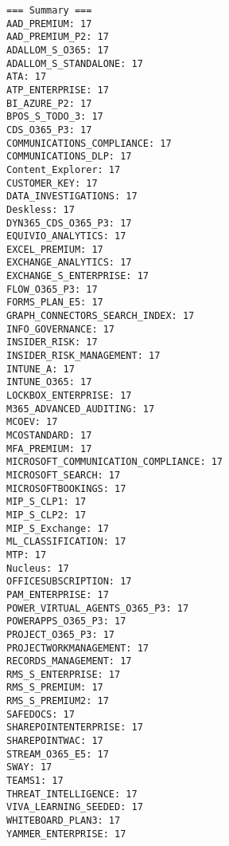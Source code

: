
\clearpage

\begin{tiny}
    \begin{verbatim}
=== Summary ===
AAD_PREMIUM: 17
AAD_PREMIUM_P2: 17
ADALLOM_S_O365: 17
ADALLOM_S_STANDALONE: 17
ATA: 17
ATP_ENTERPRISE: 17
BI_AZURE_P2: 17
BPOS_S_TODO_3: 17
CDS_O365_P3: 17
COMMUNICATIONS_COMPLIANCE: 17
COMMUNICATIONS_DLP: 17
Content_Explorer: 17
CUSTOMER_KEY: 17
DATA_INVESTIGATIONS: 17
Deskless: 17
DYN365_CDS_O365_P3: 17
EQUIVIO_ANALYTICS: 17
EXCEL_PREMIUM: 17
EXCHANGE_ANALYTICS: 17
EXCHANGE_S_ENTERPRISE: 17
FLOW_O365_P3: 17
FORMS_PLAN_E5: 17
GRAPH_CONNECTORS_SEARCH_INDEX: 17
INFO_GOVERNANCE: 17
INSIDER_RISK: 17
INSIDER_RISK_MANAGEMENT: 17
INTUNE_A: 17
INTUNE_O365: 17
LOCKBOX_ENTERPRISE: 17
M365_ADVANCED_AUDITING: 17
MCOEV: 17
MCOSTANDARD: 17
MFA_PREMIUM: 17
MICROSOFT_COMMUNICATION_COMPLIANCE: 17
MICROSOFT_SEARCH: 17
MICROSOFTBOOKINGS: 17
MIP_S_CLP1: 17
MIP_S_CLP2: 17
MIP_S_Exchange: 17
ML_CLASSIFICATION: 17
MTP: 17
Nucleus: 17
OFFICESUBSCRIPTION: 17
PAM_ENTERPRISE: 17
POWER_VIRTUAL_AGENTS_O365_P3: 17
POWERAPPS_O365_P3: 17
PROJECT_O365_P3: 17
PROJECTWORKMANAGEMENT: 17
RECORDS_MANAGEMENT: 17
RMS_S_ENTERPRISE: 17
RMS_S_PREMIUM: 17
RMS_S_PREMIUM2: 17
SAFEDOCS: 17
SHAREPOINTENTERPRISE: 17
SHAREPOINTWAC: 17
STREAM_O365_E5: 17
SWAY: 17
TEAMS1: 17
THREAT_INTELLIGENCE: 17
VIVA_LEARNING_SEEDED: 17
WHITEBOARD_PLAN3: 17
YAMMER_ENTERPRISE: 17
    \end{verbatim}
\end{tiny}

